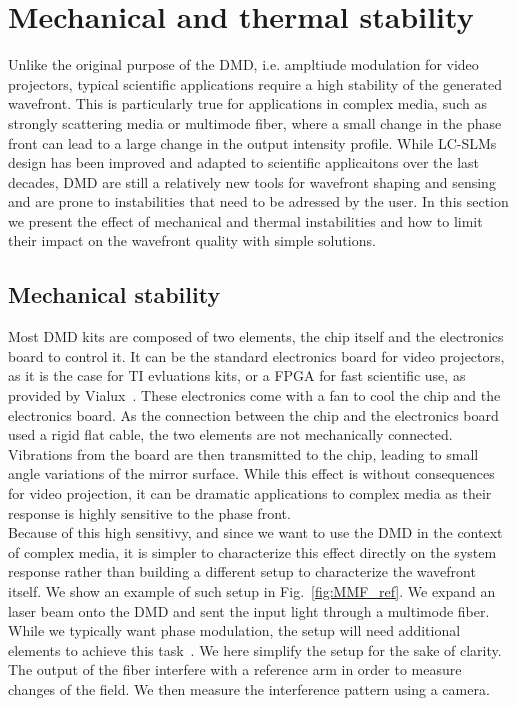 \documentclass[12pt]{iopart}
\begin{document}

\section{Mechanical and thermal stability}

Unlike the original purpose of the DMD, i.e. ampltiude modulation for video projectors, 
typical scientific applications require a high stability of the generated wavefront. 
This is particularly true for applications in complex media, 
such as strongly scattering media or multimode fiber, 
where a small change in the phase front can lead to a large change in the output intensity profile. 
While LC-SLMs design has been improved and adapted to scientific applicaitons 
over the last decades, 
DMD are still a relatively new tools for wavefront shaping and sensing 
and are prone to instabilities that need to be adressed by the user.
In this section we present the effect of mechanical and thermal instabilities 
and how to limit their impact on the wavefront quality with simple solutions.\\


\subsection{Mechanical stability}

Most DMD kits are composed of two elements, 
the chip itself and the electronics board to control it. 
It can be the standard electronics board for video projectors,
as it is the case for TI evluations kits, 
or a FPGA for fast scientific use, 
as provided by Vialux~\cite{vialux}. 
These electronics come with a fan to cool the chip and the electronics board. 
As the connection between the chip and the electronics board 
used a rigid flat cable, 
the two elements are not mechanically connected.
Vibrations from the board are then transmitted to the chip,
leading to small angle variations of the mirror surface. 
While this effect is without consequences for video projection, 
it can be dramatic applications to complex media 
as their response is highly sensitive to the phase front.\\

Because of this high sensitivy, and since we want to use the DMD 
in the context of complex media, it is simpler to characterize this effect 
directly on the system response rather than 
building a different setup to characterize the wavefront itself.
We show an example of such setup in Fig.~\ref{fig:MMF_ref}. 
We expand an laser beam onto the DMD and sent the input light through a multimode fiber. 
While we typically want phase modulation, 
the setup will need additional elements to achieve this task~\cite{}. 
We here simplify the setup for the sake of clarity. 
The output of the fiber interfere with a reference arm in order to measure 
changes of the field.
We then measure the interference pattern using a camera. \\
\end{document}
